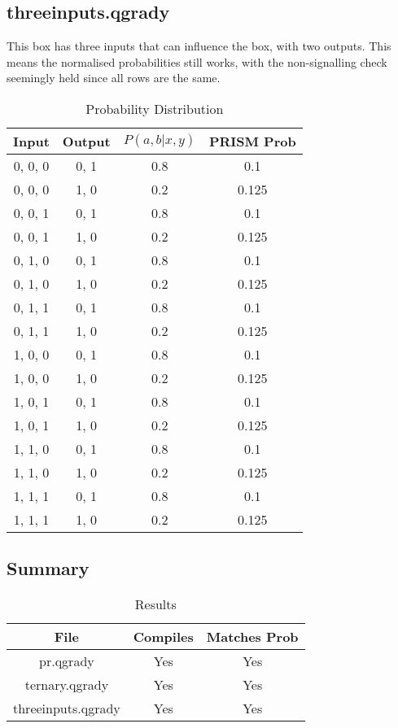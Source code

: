 \documentclass[report.tex]{subfiles}
\begin{document}
\subsection{threeinputs.qgrady} %
\label{sub:threeinputs_qgrady}
This box has three inputs that can influence the box, with two outputs. This
means the normalised probabilities still works, with the non-signalling check
seemingly held since all rows are the same.
\begin{table}[H]
  \centering
  \begin{tabular}{c | c | c | c}
    Input & Output & \(P(a, b | x, y)\) & PRISM Prob \\
    \hline
    0, 0, 0 & 0, 1 & 0.8 & 0.1 \\
    0, 0, 0 & 1, 0 & 0.2 & 0.125 \\
    0, 0, 1 & 0, 1 & 0.8 & 0.1 \\
    0, 0, 1 & 1, 0 & 0.2 & 0.125 \\
    0, 1, 0 & 0, 1 & 0.8 & 0.1 \\  
    0, 1, 0 & 1, 0 & 0.2 & 0.125 \\
    0, 1, 1 & 0, 1 & 0.8 & 0.1 \\  
    0, 1, 1 & 1, 0 & 0.2 & 0.125 \\
    1, 0, 0 & 0, 1 & 0.8 & 0.1 \\
    1, 0, 0 & 1, 0 & 0.2 & 0.125 \\
    1, 0, 1 & 0, 1 & 0.8 & 0.1 \\
    1, 0, 1 & 1, 0 & 0.2 & 0.125 \\
    1, 1, 0 & 0, 1 & 0.8 & 0.1 \\  
    1, 1, 0 & 1, 0 & 0.2 & 0.125 \\
    1, 1, 1 & 0, 1 & 0.8 & 0.1 \\  
    1, 1, 1 & 1, 0 & 0.2 & 0.125 \\
  \end{tabular}
  \caption{Probability Distribution}
  \label{tab:threeinputs_qgrady}
\end{table}

\subsection{Summary} %
\label{sub:prism_summary}
\begin{table}[H]
  \centering
  \begin{tabular}{c | c | c}
    File & Compiles & Matches Prob \\
    \hline
    pr.qgrady & Yes & Yes \\
    ternary.qgrady & Yes & Yes \\
    threeinputs.qgrady & Yes & Yes \\
  \end{tabular}
  \caption{Results}
  \label{tab:prism_results}
\end{table}

\newpage
\end{document}
